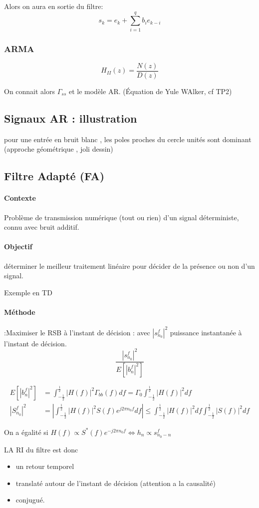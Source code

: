 \documentclass[main.tex]{subfiles}
\begin{document}
Alors on aura en sortie du filtre:
\[
  s_k= e_k + \sum_{i=1}^qb_ie_{k-i}
\]


\subsubsection{ARMA}

\[
H_{II}(z) = \frac{N(z)}{D(z)}
\]

On connait alors $\Gamma_{ss}$ et le modèle AR. (Équation de Yule WAlker, cf TP2)
\subsection{Signaux AR : illustration}


pour une entrée en bruit blanc , les poles proches du cercle unités sont dominant
(approche géométrique , joli dessin)



\subsection{Filtre Adapté (FA)}

\paragraph{Contexte} Problème de transmission numérique (tout ou rien) d'un signal déterministe, connu avec bruit additif.
\paragraph{Objectif} déterminer le meilleur traitement linéaire pour décider de la présence ou  non d'un signal.

Exemple en TD
\paragraph{Méthode} :Maximiser le RSB à l'instant de décision : avec $|s_{n_0}^f|^2$ puissance instantanée à l'instant de décision.
\[
  \boxed{
    \frac{|s_{n_0}^f|^2}{E[|b_n^f|^2]}
  }
\]
\begin{prop}
  \begin{align*}
    E[|b_n^f|^2] &=\int_{-\frac{1}{2}}^{\frac{1}{2}} |H(f)|^2\Gamma_{bb}(f)df = \Gamma_0\int_{-\frac{1}{2}}^{\frac{1}{2}} |H(f)|^2df \\
|S_{n_0}^f|^2 &=  \left| \int_{-\frac{1}{2}}^{\frac{1}{2}} |H(f)|^2 S(f) e^{j2\pi n_0f}df\right| \leq \int_{-\frac{1}{2}}^{\frac{1}{2}} |H(f)|^2df \int_{-\frac{1}{2}}^{\frac{1}{2}} |S(f)|^2df
  \end{align*}

  On a égalité si $H(f)\propto S^{*}(f)e^{-j2\pi n_0f} \iff h_n \propto s_{n_0-n}^f$

LA RI du filtre est donc
  \begin{itemize}
  \item un retour temporel
  \item translaté autour de l'instant de décision (attention a la causalité)
  \item conjugué.
  \end{itemize}
\end{prop}
\end{document}
